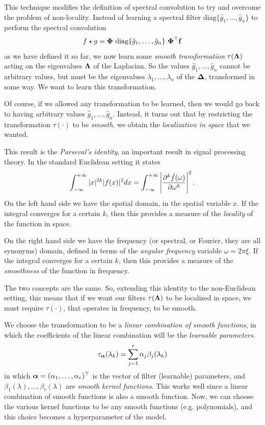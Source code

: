 This technique modifies the definition of spectral convolution to try and overcome the problem of non-locality. Instead of learning a spectral filter $\mathrm{diag} \{ \hat{g}_1, \dots, \hat{g}_n \}$ to perform the spectral convolution
\begin{equation}
    f \star g = \vb*{\Phi} ~ \mathrm{diag} \{ \hat{g}_1, \dots, \hat{g}_n \} ~ \vb*{\Phi}^{\top} \vb{f}
\end{equation}
as we have defined it so far, we now learn some \emph{smooth transformation} $\tau(\vb*{\Lambda})$ acting on the eigenvalues $\vb*{\Lambda}$ of the Laplacian. So the values $\hat{g}_1, \dots, \hat{g}_n$ cannot be arbitrary values, but must be the eigenvalues $\lambda_1, \dots, \lambda_n$ of the $\vb*{\Delta}$, transformed in some way. We want to learn this transformation.

Of course, if we allowed any transformation to be learned, then we would go back to having arbitrary values $\hat{g}_1, \dots, \hat{g}_n$. Instead, it turns out that by restricting the transformation $\tau(\cdot)$ to be \emph{smooth}, we obtain the \emph{localization in space} that we wanted.

This result is the \emph{Parseval's identity}, an important result in signal processing theory. In the standard Euclidean setting it states
\begin{equation}
    \int_{-\infty}^{+\infty} |x|^{2k} |f(x)|^2 dx = \int_{-\infty}^{+\infty} \left| \pdv[k]{\hat{f}(\omega)}{\omega} \right|^2.
\end{equation}
On the left hand side we have the spatial domain, in the spatial variable $x$. If the integral converges for a certain $k$, then this provides a measure of the \emph{locality} of the function in space.

On the right hand side we have the frequency (or spectral, or Fourier, they are all synonyms) domain, defined in terms of the \emph{angular frequency} variable $\omega = 2 \pi \xi$. If the integral converges for a certain $k$, then this provides a measure of the \emph{smoothness} of the function in frequency.

The two concepts are the same. So, extending this identity to the non-Euclidean setting, this means that if we want our filters $\tau(\vb*{\Lambda})$ to be localized in space, we must require $\tau(\cdot)$, that operates in frequency, to be smooth. 

We choose the transformation to be a \emph{linear combination of smooth functions}, in which the coefficients of the linear combination will be the \emph{learnable parameters}.
\begin{equation}
    \tau_{\vb*{\alpha}}(\lambda_k) = \sum_{j = 1}^{r} \alpha_j \beta_j (\lambda_k)
\end{equation}
in which $\vb*{\alpha} = (\alpha_1, \dots, \alpha_r)^{\top}$ is the vector of filter (learnable) parameters, and $\beta_1(\lambda), \dots, \beta_r(\lambda)$ are \emph{smooth kernel functions}. This works well since a linear combination of smooth functions is also a smooth function. Now, we can choose the various kernel functions to be any smooth functions (e.g. polynomials), and this choice becomes a hyperparameter of the model.

